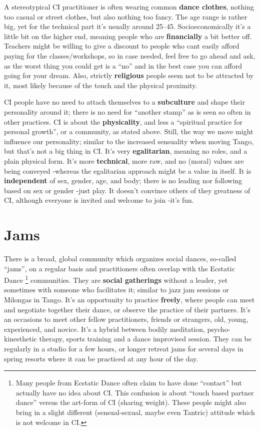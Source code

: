 A stereotypical CI practitioner is often wearing common \textbf{dance clothes}, nothing too casual or street clothes, but also nothing too fancy.
The age range is rather big, yet for the technical part it's usually around 25--45.
Socioeconomically it's a little bit on the higher end, meaning people who are \textbf{financially} a bit better off.
Teachers might be willing to give a discount to people who cant easily afford paying for the classes/workshops, so in case needed, feel free to go ahead and ask, as the worst thing you could get is a ``no'' and in the best case you can afford going for your dream.
Also, strictly \textbf{religious} people seem not to be attracted by it, most likely because of the touch and the physical proximity.

CI people have no need to attach themselves to a \textbf{subculture} and shape their personality around it; there is no need for ``another stamp'' as is seen so often in other practices.
CI is about the \textbf{physicality}, and less a ``spiritual practice for personal growth'', or a community, as stated above.
Still, the way we move might influence our personality; similar to the increased sensuality when moving Tango, but that's not a big thing in CI\@.
It's very \textbf{egalitarian}, meaning no roles, and a plain physical form.
It's more \textbf{technical}, more raw, and no (moral) values are being conveyed -whereas the egalitarian approach might be a value in itself.
It is \textbf{independent} of sex, gender, age, and body; there is no leading nor following based on sex or gender -just play.
It doesn't convince others of they greatness of CI, although everyone is invited and welcome to join -it's fun.

\section{Jams}\label{sec:jams}

There is a broad, global community which organizes social dances, so-called ``jams'', on a regular basis and practitioners often overlap with the Ecstatic Dance \footnote{Many people from Ecstatic Dance often claim to have done ``contact'' but actually have no idea about CI. This confusion is about ``touch based partner dance'' versus the art-form of CI (sharing weight). These people might also bring in a slight different (sensual-sexual, maybe even Tantric) attitude which is not welcome in CI.} communities.
They are \textbf{social gatherings} without a leader, yet sometimes with someone who facilitates it; similar to jazz jam sessions or Milongas in Tango.
It's an opportunity to practice \textbf{freely}, where people can meet and negotiate together their dance, or observe the practice of their partners.
It's an occasions to meet other fellow practitioners, friends or strangers, old, young, experienced, and novice.
It's a hybrid between bodily meditation, psycho-kinesthetic therapy, sports training and a dance improvised session.
They can be regularly in a studio for a few hours, or longer retreat jams for several days in spring resorts where it can be practiced at any hour of the day.

